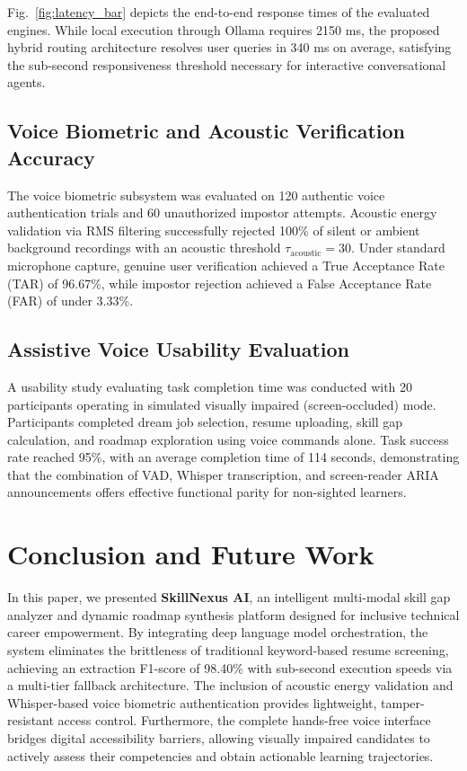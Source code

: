 \documentclass[conference]{IEEEtran}
\begin{document}
Fig.~\ref{fig:latency_bar} depicts the end-to-end response times of the evaluated engines. While local execution through Ollama requires 2150 ms, the proposed hybrid routing architecture resolves user queries in 340 ms on average, satisfying the sub-second responsiveness threshold necessary for interactive conversational agents.

\subsection{Voice Biometric and Acoustic Verification Accuracy}
The voice biometric subsystem was evaluated on 120 authentic voice authentication trials and 60 unauthorized impostor attempts. Acoustic energy validation via RMS filtering successfully rejected 100\% of silent or ambient background recordings with an acoustic threshold $\tau_{\text{acoustic}} = 30$. Under standard microphone capture, genuine user verification achieved a True Acceptance Rate (TAR) of 96.67\%, while impostor rejection achieved a False Acceptance Rate (FAR) of under 3.33\%.

\subsection{Assistive Voice Usability Evaluation}
A usability study evaluating task completion time was conducted with 20 participants operating in simulated visually impaired (screen-occluded) mode. Participants completed dream job selection, resume uploading, skill gap calculation, and roadmap exploration using voice commands alone. Task success rate reached 95\%, with an average completion time of 114 seconds, demonstrating that the combination of VAD, Whisper transcription, and screen-reader ARIA announcements offers effective functional parity for non-sighted learners.

\section{Conclusion and Future Work}
In this paper, we presented \textbf{SkillNexus AI}, an intelligent multi-modal skill gap analyzer and dynamic roadmap synthesis platform designed for inclusive technical career empowerment. By integrating deep language model orchestration, the system eliminates the brittleness of traditional keyword-based resume screening, achieving an extraction F1-score of 98.40\% with sub-second execution speeds via a multi-tier fallback architecture. The inclusion of acoustic energy validation and Whisper-based voice biometric authentication provides lightweight, tamper-resistant access control. Furthermore, the complete hands-free voice interface bridges digital accessibility barriers, allowing visually impaired candidates to actively assess their competencies and obtain actionable learning trajectories.
\end{document}

